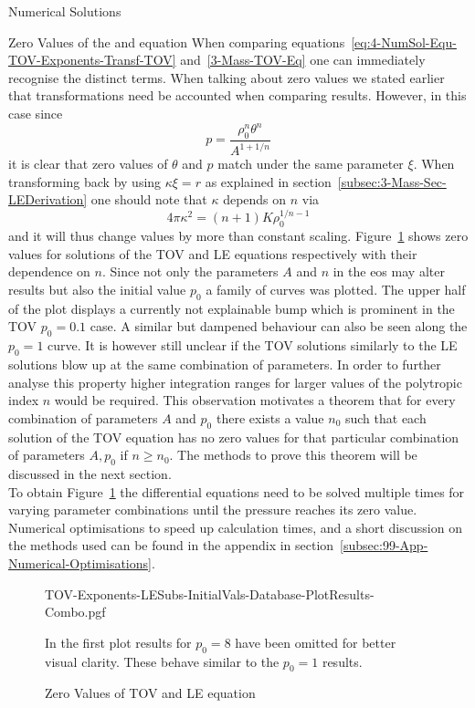 \begin{section}{Numerical Solutions}
\begin{subsection}{Zero Values of the \texorpdfstring{}{TOV} and \texorpdfstring{}{LE} equation}
When comparing equations~\eqref{eq:4-NumSol-Equ-TOV-Exponents-Transf-TOV} and~\eqref{3-Mass-TOV-Eq} one can immediately recognise the distinct terms.
When talking about zero values we stated earlier that transformations need be accounted when comparing results.
However, in this case since
\begin{equation}
	p=\frac{\rho_0^n\theta^n}{A^{1+1/n}}
	\label{eq:4-NumSol-Pressure-Theta-Relation}
\end{equation}
it is clear that zero values of $\theta$ and $p$ match under the same parameter $\xi$.
When transforming back by using $\kappa\xi=r$ as explained in section~\ref{subsec:3-Mass-Sec-LEDerivation} one should note that $\kappa$ depends on $n$ via
\begin{equation}
	4\pi\kappa^2=(n+1)K\rho_0^{1/n-1}
	\label{eq:4-NumSol-Conversion-Factor}
\end{equation}
and it will thus change values by more than constant scaling.
Figure~\ref{fig:4-NumSol-Plt-TOV-Exponents-Combo} shows zero values for solutions of the \ac{TOV} and \ac{LE} equations respectively with their dependence on $n$.
Since not only the parameters $A$ and $n$ in the \ac{eos} may alter results but also the initial value $p_0$ a family of curves was plotted.
The upper half of the plot displays a currently not explainable bump which is prominent in the \ac{TOV} $p_0=0.1$ case.
A similar but dampened behaviour can also be seen along the $p_0=1$ curve.
It is however still unclear if the \ac{TOV} solutions similarly to the \ac{LE} solutions blow up at the same combination of parameters.
In order to further analyse this property higher integration ranges for larger values of the polytropic index $n$ would be required.
This observation motivates a theorem that for every combination of parameters $A$ and $p_0$ there exists a value $n_0$ such that each solution of the TOV equation has no zero values for that particular combination of parameters $A,p_0$ if $n\geq n_0$.
The methods to prove this theorem will be discussed in the next section.\\
To obtain Figure~\ref{fig:4-NumSol-Plt-TOV-Exponents-Combo} the differential equations need to be solved multiple times for varying parameter combinations until the pressure reaches its zero value.
Numerical optimisations to speed up calculation times, and a short discussion on the methods used can be found in the appendix in section~\ref{subsec:99-App-Numerical-Optimisations}.
\begin{figure}[H]
	{\centering
	{TOV-Exponents-LESubs-InitialVals-Database-PlotResults-Combo.pgf}
	}
	\caption{Zero Values of TOV and LE equation}
	\label{fig:4-NumSol-Plt-TOV-Exponents-Combo}
	In the first plot results for $p_0=8$ have been omitted for better visual clarity.
	These behave similar to the $p_0=1$ results.
\end{figure}
\end{subsection}
%
%
\end{section}
